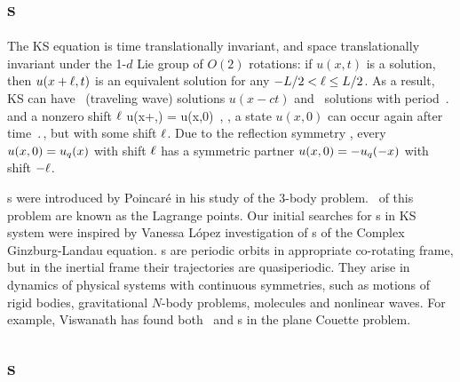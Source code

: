 \subsection{\Rpo s}

The KS equation  is time translationally invariant,
and space translationally invariant
under the 1-$d$ Lie group of $O(2)$ rotations: if
$u(x,t)$ is a solution, then $u(x+\ell,t)$ is an equivalent
solution for any $-L/2 < \ell \leq L/2$.
As a result, KS can have \reqva\ (traveling wave) solutions
$u(x-ct)$ and \rpo\ solutions with period $\period{}$ and
a nonzero shift $\ell$
\beq
u(x+\shift,\period{}) = u(x,0)
\,,
\ie, a state $u(x,0)$ can occur again after time $\period{}$,
but with some shift $\ell$.
Due to the reflection symmetry , every \rpo\
$u(x,0) = u_q(x)$ with shift $\ell$ has a symmetric partner
$u(x,0) = -u_q(-x)$ with shift $-\ell$.

{\Rpo s} were introduced by Poincar\'e in his study of
the 3-body problem.
\Reqva\ of this problem are known as the Lagrange points.
Our initial searches for \rpo s in KS system were
inspired by Vanessa L{\'o}pez investigation
of {\rpo s} of the Complex Ginzburg-Landau equation.
{\Rpo s} are periodic orbits in appropriate co-rotating frame,
but in the inertial frame their trajectories
are quasiperiodic.
They arise in dynamics of physical systems
with continuous symmetries, such as motions of rigid bodies, gravitational
$N$-body problems, molecules and nonlinear waves.
For example, Viswanath %
has found both \reqva\ and \rpo s in the plane Couette problem.

\subsection{\Po s} \label{sec:KSePO}


